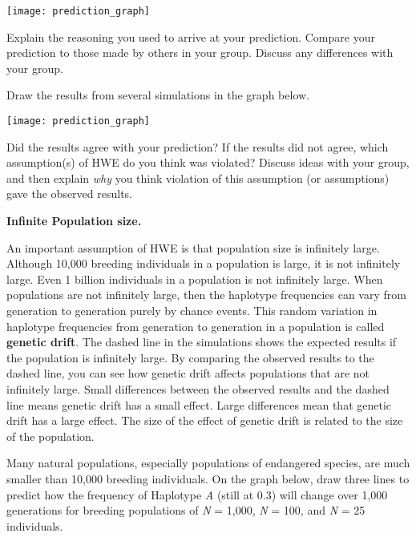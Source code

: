 \documentclass[11pt, addpoints, hidelinks]{exam}
\begin{document}
\begin{questions}
\begin{minipage}[l][3.5in]{\textwidth}
\else
	\begin{center}
		\texttt{[image: prediction\_graph]}
	\end{center}
\fi
\end{minipage}


\question[1] Explain the reasoning you used to arrive at your prediction.
Compare your prediction to those made by others in your group. Discuss
any differences with your group.

\newpage

Draw the results from several simulations in the graph below.

\begin{center}
	\texttt{[image: prediction\_graph]}
\end{center}



\question[2] Did the results agree with your prediction? If the results did not agree, which assumption(s) of HWE do you think was violated? Discuss ideas with your group, and then explain \emph{why} you think violation of this assumption (or assumptions) gave the observed results.

\begin{minipage}[t][6.5cm]{\textwidth}
	\ifprintanswers
		\textbf{Infinite Population size.}
	\fi
\end{minipage}

An important assumption of HWE is that population size is infinitely large. Although 10,000 breeding individuals in a population is large, it is not infinitely large. Even 1 billion individuals in a population is not infinitely large. When populations are not infinitely large, then the haplotype frequencies can vary from generation to generation purely by chance events. This random variation in haplotype frequencies from generation to generation in a population is called \textbf{genetic drift}. The dashed line in the simulations shows the expected results if the population is infinitely large. By comparing the observed results to the dashed line, you can see how genetic drift affects populations that are not infinitely large. Small differences between the observed results and the dashed line means genetic drift has a small effect. Large differences mean that genetic drift has a large effect. The size of the effect of genetic drift is related to the size of the population.


\question
Many natural populations, especially populations of
endangered species, are much smaller than 10,000 breeding individuals.
On the graph below, draw three lines to predict how the frequency of
Haplotype \emph{A} (still at 0.3) will change over 1,000 generations for
breeding populations of \emph{N} = 1,000, \emph{N} = 100, and \emph{N} =
25 individuals.


\end{questions}
\end{document}
